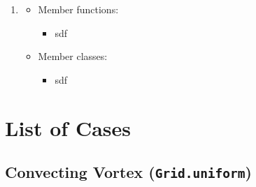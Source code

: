 \documentclass[letterpaper,10pt]{article}
\begin{document}
\begin{enumerate}
\begin{itemize}
\begin{itemize}
    \end{itemize}
  \end{itemize}

\item {}
  \vspace{-2mm}\begin{itemize}
  \item \textcolor{lc2}{Member functions:}
    \begin{itemize}
    \item sdf
    \end{itemize}

  \item \textcolor{lc2}{Member classes:}
    \begin{itemize}
    \item sdf
    \end{itemize}
  \end{itemize}

\end{enumerate}



\clearpage

\section{List of Cases} \label{sec:grids}


\subsection{Convecting Vortex (\texttt{Grid.uniform})}
\end{document}
